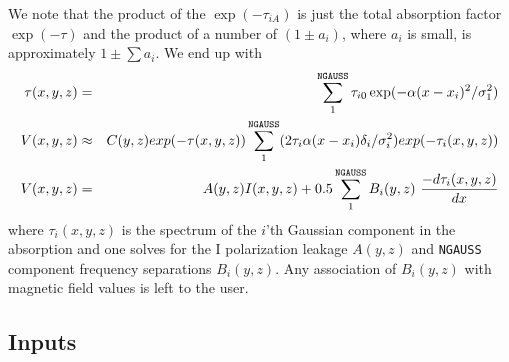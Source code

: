 \documentclass[twoside]{article}
\begin{document}
We note that the product of the $\exp (-\tau_{iA})$ is just the total
absorption factor $\exp (-\tau)$ and the product of a number of
$(1 \pm a_i)$, where $a_i$ is small, is approximately $1 \pm \sum
a_i$.  We end up with
\begin{eqnarray}
  \tau(x,y,z) & = & \sum_1^{\tt NGAUSS} \tau_{i0} \exp (-\alpha
              (x-x_i)^2 / \sigma_1^2) \\
  V(x,y,z) & \approx & C(y,z) exp (-\tau(x,y,z)) \sum_1^{\tt NGAUSS}
              (2 \tau_i \alpha (x - x_i) \delta_i / \sigma_i^2)
              exp (-\tau_i(x,y,z)) \label{eqn:ZemanGaus}\\
  V(x,y,z) & = & A(y,z) I(x,y,z) + 0.5 \sum_1^{\tt NGAUSS} B_i(y,z)\,
        \,\frac{-d\tau_i(x,y,z)}{dx}
\end{eqnarray}
where $\tau_i(x,y,z)$ is the spectrum of the $i$'th Gaussian component
in the absorption and one solves for the I polarization leakage
$A(y,z)$ and {\tt NGAUSS} component frequency separations $B_i(y,z)$.
Any association of $B_i(y,z)$ with magnetic field values is left to
the user.

\subsection{Inputs}
\end{document}
